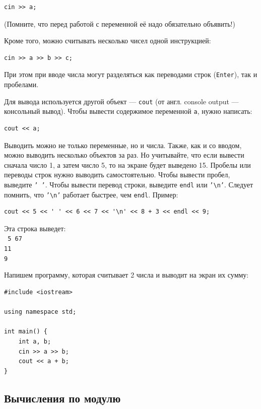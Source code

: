 \documentclass{article}
\begin{document}
	\begin{lstlisting}
cin >> a;
	\end{lstlisting}
	
	(Помните, что перед работой с переменной её надо обязательно объявить!)
	
	Кроме того, можно считывать несколько чисел одной инструкцией:
	
	\begin{lstlisting}
cin >> a >> b >> c;
	\end{lstlisting}
	
	При этом при вводе числа могут разделяться как переводами строк (\texttt{Enter}), так и пробелами.
	
	Для вывода используется другой объект --- \texttt{cout} (от англ. console output --- консольный вывод). Чтобы вывести содержимое переменной \texttt{a}, нужно написать:
	
	\begin{lstlisting}
cout << a;
	\end{lstlisting}
	
	Выводить можно не только переменные, но и числа. Также, как и со вводом, можно выводить несколько объектов за раз. Но учитывайте, что если вывести сначала число 1, а затем число 5, то на экране будет выведено 15. Пробелы или переводы строк нужно выводить самостоятельно. Чтобы вывести пробел, выведите \texttt{' '}. Чтобы вывести перевод строки, выведите \texttt{endl} или \texttt{'\textbackslash n'}. Следует помнить, что \texttt{'\textbackslash n'} работает быстрее, чем \texttt{endl}. Пример:
	
	\begin{lstlisting}
cout << 5 << ' ' << 6 << 7 << '\n' << 8 + 3 << endl << 9;
	\end{lstlisting}
	Эта строка выведет:\\
	\texttt{
	5 67\\
	11\\
	9}
	
	Напишем программу, которая считывает 2 числа и выводит на экран их сумму:
	
	\begin{lstlisting}
#include <iostream>

using namespace std;

int main() {
	int a, b;
	cin >> a >> b;
	cout << a + b;
}
	\end{lstlisting}
	
	\subsection{Вычисления по модулю}
	
\end{document}
